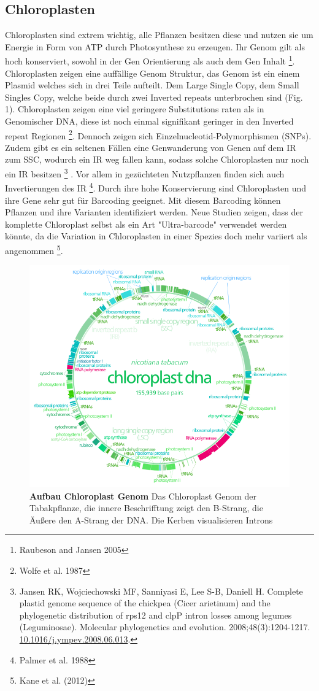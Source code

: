\documentclass{scrartcl}
\begin{document}
\subsection{Chloroplasten}
\label{sec-2-1}
Chloroplasten sind extrem wichtig, alle Pflanzen besitzen diese und nutzen sie um Energie in Form von ATP durch Photosynthese zu erzeugen.
Ihr Genom gilt als hoch konserviert, sowohl in der Gen Orientierung als auch dem Gen Inhalt \footnote{Raubeson and Jansen 2005}. Chloroplasten zeigen
eine auffällige Genom Struktur, das Genom ist ein einem Plasmid welches sich in drei Teile aufteilt. Dem Large Single Copy, dem 
Small Singles Copy, welche beide durch zwei Inverted repeats unterbrochen sind (Fig. 1). Chloroplasten zeigen eine viel geringere Substitutions raten
als in Genomischer DNA, diese ist noch einmal signifikant geringer in den Inverted repeat Regionen \footnote{Wolfe et al. 1987}. Dennoch zeigen sich
Einzelnucleotid-Polymorphismen (SNPs). Zudem gibt es ein seltenen Fällen eine Genwanderung von Genen auf dem IR zum SSC, wodurch ein IR weg
fallen kann, sodass solche Chloroplasten nur noch ein IR besitzen \footnote{Jansen RK, Wojciechowski MF, Sanniyasi E, Lee S-B, Daniell H. Complete plastid genome sequence of the chickpea (Cicer arietinum) and the phylogenetic distribution of rps12 and clpP intron losses among legumes (Leguminosae). Molecular phylogenetics and evolution. 2008;48(3):1204-1217. \url{10.1016/j.ympev.2008.06.013}.} . Vor allem in gezüchteten Nutzpflanzen finden sich auch 
Invertierungen des IR \footnote{Palmer et al. 1988}. Durch ihre hohe Konservierung sind Chloroplasten und ihre Gene sehr gut für Barcoding geeignet. Mit diesem
Barcoding können Pflanzen und ihre Varianten identifiziert werden. Neue Studien zeigen, dass der komplette Chloroplast selbst als ein Art "Ultra-barcode"
verwendet werden könnte, da die Variation in Chloroplasten in einer Spezies doch mehr variiert als angenommen \footnote{Kane et al. (2012)}. 
\begin{figure}
\includegraphics[width=.9\linewidth]{./703px-CtDNA.png}
\caption[Aufbau Chloroplast Genom]{\textbf{Aufbau Chloroplast Genom} Das Chloroplast Genom der Tabakpflanze, die innere Beschrifftung zeigt den B-Strang, die Äußere den A-Strang der DNA. Die Kerben visualisieren Introns}
\end{figure}
\end{document}
